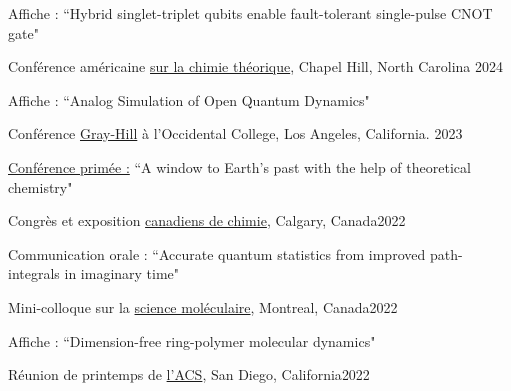 \documentclass[margin,line]{res}
\newenvironment{list1}{
 \begin{list}{\ding{113}}{%
  \setlength{\itemsep}{0in}
  \setlength{\parsep}{0in} \setlength{\parskip}{0in}
  \setlength{\topsep}{0in} \setlength{\partopsep}{0in} 
  \setlength{\leftmargin}{0.17in}}}{\end{list}}
\begin{document}
\begin{resume}
\begin{list1}
\item[]Affiche : ``Hybrid singlet-triplet qubits enable fault-tolerant single-pulse CNOT gate"
\end{list1}

\vspace*{-1mm}

Conférence américaine \href{https://www.actc2024.org/}{sur la chimie théorique}, Chapel Hill, North Carolina \hfill{2024}

\begin{list1}
\item[]Affiche : ``Analog Simulation of Open Quantum Dynamics"
\end{list1}

\vspace*{-1mm}

Conférence \href{https://www.oxy.edu/academics/student-research/urc/2023-summer-research-program}{Gray-Hill} à l'Occidental College, Los Angeles, California.  \hfill{2023}

\begin{list1}
\item[]\underline{Conférence primée :} ``A window to Earth's past with the help of theoretical chemistry"
\end{list1}

\vspace*{-1mm}

Congrès et exposition \href{https://www.cheminst.ca/conference/canadian-chemistry-conference-and-exhibition/}{canadiens de chimie}, Calgary, Canada\hfill {2022}

\begin{list1}
\item[]Communication orale : ``Accurate quantum statistics from improved path-integrals in imaginary time" 
\end{list1}
\vspace*{-1mm}

Mini-colloque sur la \href{https://www.siminegroup.ca/mms/mms2022}{science moléculaire}, Montreal, Canada\hfill{2022}

\begin{list1}
\item[]Affiche : ``Dimension-free ring-polymer molecular dynamics"
\end{list1}

\vspace*{-1mm}

Réunion de printemps de \href{https://www.morressier.com/o/event/623377e0b300ee00119b311f}{l'ACS}, San Diego, California\hfill{2022}


\end{resume}
\end{document}
